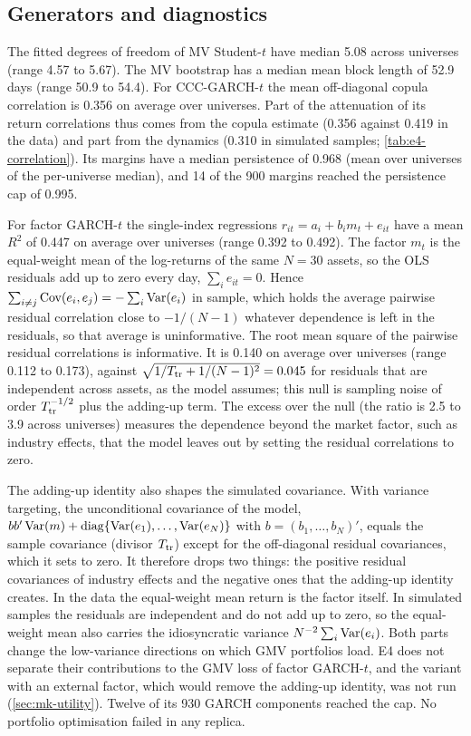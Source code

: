 \subsection{Generators and diagnostics}\label{app:mk-generators}

The fitted degrees of freedom of MV Student-$t$ have median 5.08 across universes (range 4.57 to
5.67). The MV bootstrap has a median mean block length of 52.9 days (range 50.9 to 54.4). For
CCC-GARCH-$t$ the mean off-diagonal copula correlation is 0.356 on average over universes. Part
of the attenuation of its return correlations thus comes from the copula estimate (0.356 against
0.419 in the data) and part from the dynamics (0.310 in simulated samples;
\cref{tab:e4-correlation}). Its margins have a median
persistence of 0.968 (mean over universes of the per-universe median), and 14 of the 900 margins
reached the persistence cap of 0.995.

For factor GARCH-$t$ the single-index regressions $r_{it}=a_i+b_im_t+e_{it}$ have a mean $R^2$ of
0.447 on average over universes (range 0.392 to 0.492). The factor $m_t$ is the equal-weight mean
of the log-returns of the same $N=30$ assets, so the OLS residuals add up to zero every day,
$\sum_ie_{it}=0$. Hence $\sum_{i\ne j}\operatorname{Cov}(e_i,e_j)=-\sum_i\operatorname{Var}(e_i)$ in sample, which holds the
average pairwise residual correlation close to $-1/(N-1)$ whatever dependence is left in the
residuals, so that average is uninformative. The root mean square of the pairwise residual
correlations is informative. It is 0.140 on average over universes (range 0.112 to 0.173), against
$\sqrt{1/T_{\mathrm{tr}}+1/(N-1)^2}=0.045$ for residuals that are independent across assets, as the model
assumes; this null is sampling noise of order $T_{\mathrm{tr}}^{-1/2}$ plus the adding-up term. The excess
over the null (the ratio is 2.5 to 3.9 across universes) measures the dependence beyond the market
factor, such as industry effects, that the model leaves out by setting the residual correlations
to zero.

The adding-up identity also shapes the simulated covariance. With variance targeting, the
unconditional covariance of the model, $bb'\operatorname{Var}(m)+\operatorname{diag}\{\operatorname{Var}(e_1),\dots,\operatorname{Var}(e_N)\}$ with
$b=(b_1,\dots,b_N)'$, equals the \TRAIN{} sample covariance (divisor $T_{\mathrm{tr}}$) except for the
off-diagonal residual covariances, which it sets to zero. It therefore drops two things: the
positive residual covariances of industry effects and the negative ones that the adding-up
identity creates. In the data the equal-weight mean return is the factor itself. In simulated
samples the residuals are independent and do not add up to zero, so the equal-weight mean also
carries the idiosyncratic variance $N^{-2}\sum_i\operatorname{Var}(e_i)$. Both parts change the low-variance
directions on which GMV portfolios load. E4 does not separate their contributions to the GMV loss
of factor GARCH-$t$, and the variant with an external factor, which would remove the adding-up
identity, was not run (\cref{sec:mk-utility}). Twelve of its 930 GARCH components reached the
cap. No portfolio optimisation failed in any replica.


